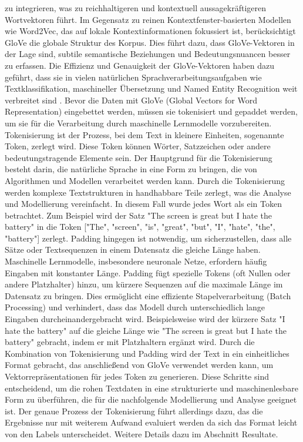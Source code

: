 \documentclass[12pt]{article}
\begin{document}
zu integrieren, was zu reichhaltigeren und kontextuell aussagekräftigeren Wortvektoren führt. Im Gegensatz zu reinen Kontextfenster-basierten Modellen 
wie Word2Vec, das auf lokale Kontextinformationen fokussiert ist, berücksichtigt GloVe die globale Struktur des Korpus. Dies führt dazu, dass 
GloVe-Vektoren in der Lage sind, subtile semantische Beziehungen und Bedeutungsnuancen besser zu erfassen. Die Effizienz und Genauigkeit der 
GloVe-Vektoren haben dazu geführt, dass sie in vielen natürlichen Sprachverarbeitungsaufgaben wie Textklassifikation, maschineller Übersetzung und 
Named Entity Recognition weit verbreitet sind \cite{pennington2014glove}.
\newline
\newline
Bevor die Daten mit GloVe (Global Vectors for Word Representation) eingebettet werden, müssen sie tokenisiert und gepaddet werden, um sie für die Verarbeitung durch maschinelle Lernmodelle vorzubereiten. 
Tokenisierung ist der Prozess, bei dem Text in kleinere Einheiten, sogenannte Token, zerlegt wird. Diese Token können Wörter, Satzzeichen oder andere bedeutungstragende Elemente sein. Der Hauptgrund für die Tokenisierung besteht darin, die natürliche Sprache in eine Form zu bringen, die von Algorithmen und Modellen verarbeitet werden kann. Durch die Tokenisierung werden komplexe Textstrukturen in handhabbare Teile zerlegt, was die Analyse und Modellierung vereinfacht. In diesem Fall wurde jedes Wort als ein Token betrachtet. Zum Beispiel wird der Satz "The screen is great but I hate the battery" in die Token ["The", "screen", "is", "great", "but", "I", "hate", "the", "battery"] zerlegt.
Padding hingegen ist notwendig, um sicherzustellen, dass alle Sätze oder Textsequenzen in einem Datensatz die gleiche Länge haben. Maschinelle Lernmodelle, insbesondere neuronale Netze, erfordern häufig Eingaben mit konstanter Länge. Padding fügt spezielle Tokens (oft Nullen oder andere Platzhalter) hinzu, um kürzere Sequenzen auf die maximale Länge im Datensatz zu bringen. Dies ermöglicht eine effiziente Stapelverarbeitung (Batch Processing) und verhindert, dass das Modell durch unterschiedlich lange Eingaben durcheinandergebracht wird. Beispielsweise wird der kürzere Satz "I hate the battery" auf die gleiche Länge wie "The screen is great but I hate the battery" gebracht, indem er mit Platzhaltern ergänzt wird.
\newline
\newline
Durch die Kombination von Tokenisierung und Padding wird der Text in ein einheitliches Format gebracht, das anschließend von GloVe verwendet werden kann, um Vektorrepräsentationen für jedes Token zu generieren. Diese Schritte sind entscheidend, um die rohen Textdaten in eine strukturierte und maschinenlesbare Form zu überführen, die für die nachfolgende Modellierung und Analyse geeignet ist. Der genaue Prozess der Tokenisierung führt allerdings dazu, das die Ergebnisse nur mit weiterem Aufwand evaluiert werden da sich das Format leicht von den Labels unterscheidet. Weitere Details dazu im Abschnitt Resultate.
\end{document}
